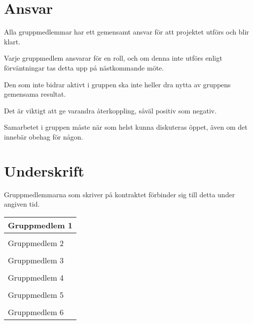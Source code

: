 \documentclass[11pt]{article}
\begin{document}
\begin{flushleft}
\begin{itemize}
\end{itemize}


\section{Ansvar}
Alla gruppmedlemmar har ett gemensamt ansvar för att projektet utförs och blir klart. 

Varje gruppmedlem ansvarar för en roll, och om denna inte utförs enligt förväntningar tas detta upp på nästkommande möte.

Den som inte bidrar aktivt i gruppen ska inte heller dra nytta av gruppens gemensama resultat.

Det är viktigt att ge varandra återkoppling, såväl positiv som negativ.

Samarbetet i gruppen måste när som helst kunna diskuteras öppet, även om det innebär obehag för någon. 

\pagebreak

\setcounter{secnumdepth}{0}

\section{Underskrift}
Gruppmedlemmarna som skriver på kontraktet förbinder sig till detta under angiven tid. \\[1in]
\begin{table}[h]
\begin{tabular}{p{\linewidth}}

Gruppmedlem 1
\\ \hline \\[0.5in]
Gruppmedlem 2
\\ \hline \\[0.5in]
Gruppmedlem 3
\\ \hline \\[0.5in]
Gruppmedlem 4
\\ \hline \\[0.5in]
Gruppmedlem 5
\\ \hline \\[0.5in]
Gruppmedlem 6
\\ \hline

\end{tabular}
\end{table}


\setcounter{secnumdepth}{2}

\end{flushleft}
\end{document}
